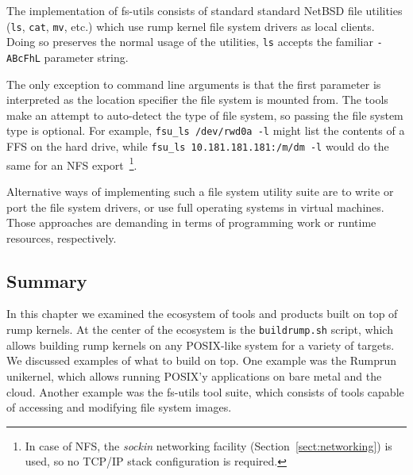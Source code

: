 The implementation of fs-utils consists of standard standard NetBSD file
utilities (\texttt{ls}, \texttt{cat}, \texttt{mv}, etc.) which use rump
kernel file system drivers as local clients.  Doing so preserves the
normal usage of the utilities, \eg \texttt{ls} accepts the familiar
\texttt{-ABcFhL} parameter string.

The only exception to command line arguments is that the first parameter
is interpreted as the location specifier the file system is mounted from.
The tools make an attempt to auto-detect the type of file system, so passing the file system
type is optional.  For example, \verb+fsu_ls /dev/rwd0a -l+ might list
the contents of
a FFS on the hard drive, while \verb+fsu_ls 10.181.181.181:/m/dm -l+
would do the same for an NFS
export~\footnote
{
	In case of NFS, the \textit{sockin} networking facility
	(Section~\ref{sect:networking}) is used, so no TCP/IP stack
	configuration is required.
}.

Alternative ways of implementing such a file system utility suite are
to write or port the file system drivers, or use full operating systems in
virtual machines.  Those approaches are demanding in terms of programming
work or runtime resources, respectively.


\subsection{Summary}

In this chapter we examined the ecosystem of tools and products built on
top of rump kernels.  At the center of the ecosystem is the
\texttt{buildrump.sh}
script, which allows building rump kernels on any POSIX-like system for
a variety of targets.  We discussed examples of what to build on top.
One example was the Rumprun unikernel, which allows running POSIX'y
applications on bare metal and the cloud.  Another example was the
fs-utils tool suite, which consists of tools capable of accessing and
modifying file system images.
